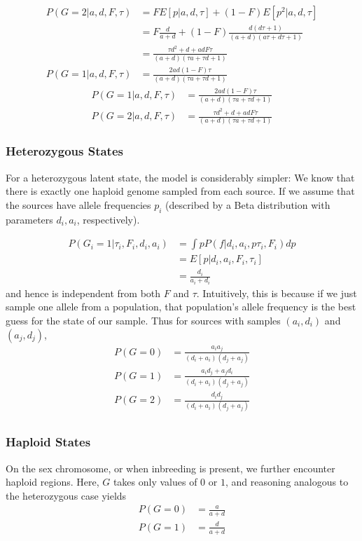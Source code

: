 \documentclass[10pt,a4paper]{article}
\begin{document}
\begin{align}
P(G=2 | a,d, F, \tau) &= F E[p|a,d, \tau] + (1-F)  E[p^2|a, d, \tau]\nonumber\\
&= F \frac{d}{a+d} + (1-F)  \frac{d (d\tau+1)}{(a+d)(a\tau+d\tau+1)}\nonumber\\
&= \frac{\tau d^2 + d + adF\tau}{(a+d)(\tau a+\tau d+1)}\\
P(G=1 | a,d, F, \tau) &= \frac{2ad(1-F)\tau}{(a+d)(\tau a+\tau d+1)}
\end{align}
\begin{align}
P(G=1 | a,d, F, \tau) &= \frac{2ad(1-F)\tau}{(a+d)(\tau a+\tau d+1)}\\
P(G=2 | a,d, F, \tau) &= \frac{\tau d^2 + d + adF\tau}{(a+d)(\tau a+\tau d+1)}
\end{align}


\subsubsection{Heterozygous States}
For a heterozygous latent state, the model is considerably simpler: We know that there is exactly one haploid genome sampled from each source. If we assume that the sources have allele frequencies $p_i$ (described by a Beta distribution with parameters $d_i, a_i$, respectively).

\begin{align}
P(G_i = 1 | \tau_i, F_i, d_i, a_i) &=  \int p P(f| d_i, a_i, p \tau_i, F_i) dp\nonumber\\
&= E[p| d_i, a_i, F_i, \tau_i]\nonumber\\
&=\frac{d_i}{a_i+d_i}\label{eq:ll:het}
\end{align}
and hence is independent from both $F$ and $\tau$. Intuitively, this is because if we just sample one allele from a population, that population's allele frequency is the best guess for the state of our sample.
Thus for sources with samples $(a_i, d_i)$ and $(a_j, d_j)$, 
\begin{align*}
P(G=0) &= \frac{a_i a_j}{(d_i+a_i)(d_j+a_j)}\\
P(G=1) &= \frac{a_id_j + a_jd_i}{(d_i+a_i)(d_j+a_j)}\\
P(G=2) &= \frac{d_i d_j}{(d_i+a_i)(d_j+a_j)}\\
\end{align*}



\subsubsection{Haploid States}
On the sex chromosome, or when inbreeding is present, we further encounter haploid regions. Here, $G$ takes only values of $0$ or $1$, and reasoning analogous to the heterozygous case yields
\begin{align}
P(G=0) &= \frac{a}{a+d}\nonumber\\
P(G=1) &= \frac{d}{a+d}\label{eq:ll:hap}
\end{align}
\end{document}
